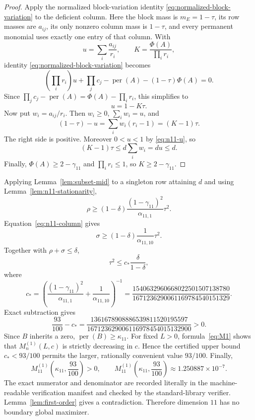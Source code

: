 \documentclass[11pt,a4paper]{article}
\numberwithin{equation}{section}
\theoremstyle{definition}
\newcommand{\per}{\operatorname{per}}
\newcommand{\1}{\mathbf{1}}
\begin{document}
\begin{proof}
Apply the normalized block-variation identity
\eqref{eq:normalized-block-variation} to the deficient column.  Here the
block mass is $m_E=1-\tau$, its row masses are $a_{ij}$, its only nonzero
column mass is $1-\tau$, and every permanent monomial uses exactly one
entry of that column.  With
\[
 u=\sum_i\frac{a_{ij}}{r_i},
 \qquad
 K=\frac{\Phi(A)}{\prod_i r_i},
\]
identity \eqref{eq:normalized-block-variation} becomes
\[
 \left(\prod_i r_i\right)u
 +\prod_jc_j-\per(A)
 -(1-\tau)\Phi(A)=0.
\]
Since $\prod_jc_j-\per(A)=\Phi(A)-\prod_i r_i$, this simplifies to
\begin{equation}\label{eq:n11-u}
 u=1-K\tau.
\end{equation}
Now put $w_i=a_{ij}/r_i$.  Then $w_i\ge0$, $\sum_iw_i=u$, and
\[
 (1-\tau)-u
 =\sum_iw_i(r_i-1)
 =(K-1)\tau.
\]
The right side is positive.  Moreover $0<u<1$ by \eqref{eq:n11-u}, so
\[
 (K-1)\tau
 \le d\sum_iw_i
 =du\le d.
\]
Finally, $\Phi(A)\ge2-\gamma_{11}$ and $\prod_i r_i\le1$, so $K\ge2-\gamma_{11}$.
\end{proof}

Applying Lemma~\ref{lem:subset-mid} to a singleton row attaining $d$ and using Lemma~\ref{lem:n11-stationarity},
\begin{equation}\label{eq:n11-rho}
 \rho\ge
 (1-\delta)\frac{(1-\gamma_{11})^2}{\alpha_{11,1}}\tau^2.
\end{equation}
Equation~\eqref{eq:n11-column} gives
\begin{equation}\label{eq:n11-sigma}
 \sigma\ge
 (1-\delta)\frac1{\alpha_{11,10}}\tau^2.
\end{equation}
Together with $\rho+\sigma\le\delta$,
\begin{equation}\label{eq:n11-cstar-bound}
 \tau^2\le c_*\frac{\delta}{1-\delta},
\end{equation}
where
\begin{equation}\label{eq:n11-cstar}
 c_*=
 \left(
 \frac{(1-\gamma_{11})^2}{\alpha_{11,1}}
 +\frac1{\alpha_{11,10}}
 \right)^{-1}
 =\frac{1540632960668022501507138780}
 {1671236290061169784540151329}.
\end{equation}
Exact subtraction gives
\begin{equation}\label{eq:n11-cstar-gap}
 \frac{93}{100}-c_*
 =\frac{1361678908886539811520195597}
 {167123629006116978454015132900}>0.
\end{equation}
Since $B$ inherits a zero, $\per(B)\ge\kappa_{11}$.  For fixed $L>0$,
formula~\eqref{eq:M1} shows that $M_n^{(1)}(L,c)$ is strictly decreasing in
$c$.  Hence the certified upper bound $c_*<93/100$ permits the larger,
rationally convenient value $93/100$.  Finally,
\begin{equation}\label{eq:n11-special-margin}
 M_{11}^{(1)}\left(\kappa_{11},\frac{93}{100}\right)>0,
 \qquad
 M_{11}^{(1)}\left(\kappa_{11},\frac{93}{100}\right)
 \approx1.250887\times10^{-7}.
\end{equation}
The exact numerator and denominator are recorded literally in the
machine-readable verification manifest and checked by the standard-library
verifier.
Lemma~\ref{lem:first-order} gives a contradiction.  Therefore dimension $11$ has no boundary global maximizer.
\end{document}
